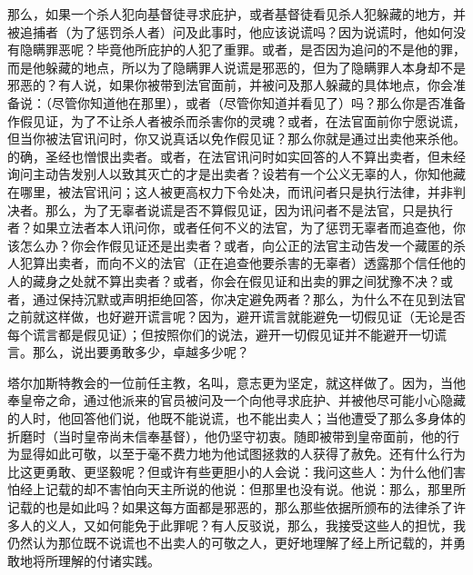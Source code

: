 那么，如果一个杀人犯向基督徒寻求庇护，或者基督徒看见杀人犯躲藏的地方，并被追捕者（为了惩罚杀人者）问及此事时，他应该说谎吗？因为说谎时，他如何没有隐瞒罪恶呢？毕竟他所庇护的人犯了重罪。或者，是否因为追问的不是他的罪，而是他躲藏的地点，所以为了隐瞒罪人说谎是邪恶的，但为了隐瞒罪人本身却不是邪恶的？有人说，如果你被带到法官面前，并被问及那人躲藏的具体地点，你会准备说：（尽管你知道他在那里），或者（尽管你知道并看见了）吗？那么你是否准备作假见证，为了不让杀人者被杀而杀害你的灵魂？或者，在法官面前你宁愿说谎，但当你被法官讯问时，你又说真话以免作假见证？那么你就是通过出卖他来杀他。的确，圣经也憎恨出卖者。或者，在法官讯问时如实回答的人不算出卖者，但未经询问主动告发别人以致其灭亡的才是出卖者？设若有一个公义无辜的人，你知他藏在哪里，被法官讯问；这人被更高权力下令处决，而讯问者只是执行法律，并非判决者。那么，为了无辜者说谎是否不算假见证，因为讯问者不是法官，只是执行者？如果立法者本人讯问你，或者任何不义的法官，为了惩罚无辜者而追查他，你该怎么办？你会作假见证还是出卖者？或者，向公正的法官主动告发一个藏匿的杀人犯算出卖者，而向不义的法官（正在追查他要杀害的无辜者）透露那个信任他的人的藏身之处就不算出卖者？或者，你会在假见证和出卖的罪之间犹豫不决？或者，通过保持沉默或声明拒绝回答，你决定避免两者？那么，为什么不在见到法官之前就这样做，也好避开谎言呢？因为，避开谎言就能避免一切假见证（无论是否每个谎言都是假见证）；但按照你们的说法，避开一切假见证并不能避开一切谎言。那么，说出要勇敢多少，卓越多少呢？\par

塔尔加斯特教会的一位前任主教，名叫，意志更为坚定，就这样做了。因为，当他奉皇帝之命，通过他派来的官员被问及一个向他寻求庇护、并被他尽可能小心隐藏的人时，他回答他们说，他既不能说谎，也不能出卖人；当他遭受了那么多身体的折磨时（当时皇帝尚未信奉基督），他仍坚守初衷。随即被带到皇帝面前，他的行为显得如此可敬，以至于毫不费力地为他试图拯救的人获得了赦免。还有什么行为比这更勇敢、更坚毅呢？但或许有些更胆小的人会说：我问这些人：为什么他们害怕经上记载的却不害怕向天主所说的他说：但那里也没有说。他说：那么，那里所记载的也是如此吗？如果这每方面都是邪恶的，那么那些依据所颁布的法律杀了许多人的义人，又如何能免于此罪呢？有人反驳说，那么，我接受这些人的担忧，我仍然认为那位既不说谎也不出卖人的可敬之人，更好地理解了经上所记载的，并勇敢地将所理解的付诸实践。\par


